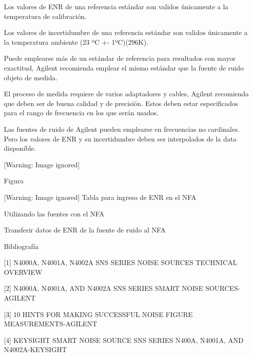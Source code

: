 \documentclass{article}
\newcounter{Drawing}
\renewcommand\theDrawing{\arabic{Drawing}}
\begin{document}
Los valores de ENR de una referencia estándar son validos únicamente a la temperatura de calibración.

Los valores de incertidumbre de una referencia estándar son validos únicamente a la temperatura ambiente (23 ºC +- 1ºC)(296K).

Puede emplearse más de un estándar de referencia para resultados con mayor exactitud, Agilent recomienda emplear el mismo estándar que la fuente de ruido objeto de medida.

El proceso de medida requiere de varios adaptadores y cables, Agilent recomienda que deben ser de buena calidad y de precisión. Estos deben estar especificados para el rango de frecuencia en los que serán usados.

Las fuentes de ruido de Agilent pueden emplearse en frecuencias no cardinales. Pero los valores de ENR y su incertidumbre deben ser interpolados de la data disponible.



\begin{center}
 [Warning: Image ignored] %

\end{center}
\begin{center}
\begin{minipage}{13.707cm}
Figura \stepcounter{Drawing}{\theDrawing}

 [Warning: Image ignored] %
\-Tabla para ingreso de ENR en el NFA
\end{minipage}
\end{center}

\bigskip

Utilizando las fuentes con el NFA

Transferir datos de ENR de la fuente de ruido al NFA


\bigskip

Bibliografía

[1] N4000A, N4001A, N4002A SNS SERIES NOISE SOURCES TECHNICAL OVERVIEW

[2] N4000A, N4001A, AND N4002A SNS SERIES SMART NOISE SOURCES-AGILENT

[3] 10 HINTS FOR MAKING SUCCESSFUL NOISE FIGURE MEASUREMENTS-AGILENT


\bigskip

[4] KEYSIGHT SMART NOISE SOURCE SNS SERIES N400A, N4001A, AND N4002A-KEYSIGHT
\end{document}
